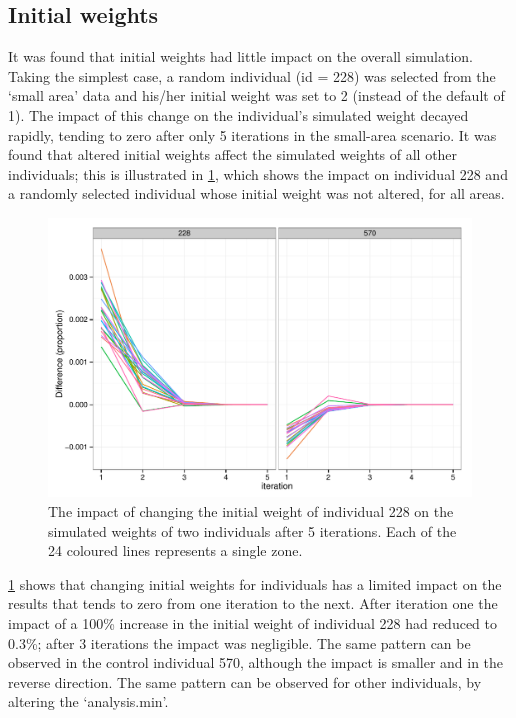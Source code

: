 \documentclass[a4paper,10pt]{article}
\begin{document}
\subsection{Initial weights}
It was found that initial weights had little impact on the overall simulation. 
Taking the simplest case, a random individual (id = 228) was selected from the 
`small area' data and his/her initial weight was set to 2 
(instead of the default of 1). The impact of this change on the individual's 
simulated weight decayed rapidly, tending to zero after only 5 iterations in the small-area scenario. 
It was found that altered initial weights affect the simulated weights of all other individuals; 
this is illustrated in \cref{ficweight}, which shows the impact on individual 228 and a randomly selected 
individual whose initial weight was not altered, for all areas.

\begin{figure}
 \begin{center}
  \includegraphics[width=12cm]{weight-1-5-its}
 \end{center}
\caption{The impact of changing the initial weight of individual 228 on the simulated weights of two individuals after 5 iterations. Each of the 24 coloured lines represents a single zone.}
\label{ficweight}
\end{figure}

\cref{ficweight} shows that changing initial weights 
for individuals has a limited impact on the results that
 tends to zero from one iteration to the next. 
After iteration one the impact of a 100\% increase in the initial weight 
of individual 228 had reduced to 0.3\%; after 3 iterations the impact was negligible. 
The same pattern can be observed in the control individual 570, 
although the impact is smaller and in the reverse direction. 
The same pattern can be observed for other individuals, by altering the `analysis.min'.
\end{document}
